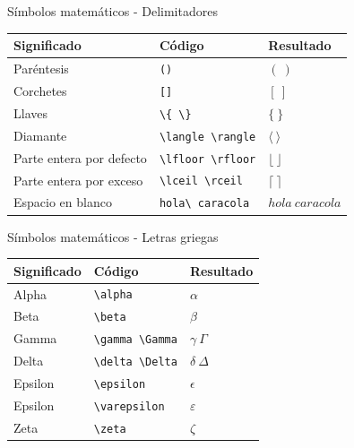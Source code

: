 \documentclass[
  ignorenonframetext,
  aspectratio=169]{beamer}
\begin{document}
\begin{frame}[fragile]{Símbolos matemáticos - Delimitadores}
\protect\hypertarget{suxedmbolos-matemuxe1ticos---delimitadores}{}
\begin{longtable}[]{@{}lll@{}}
\toprule()
Significado & Código & Resultado \\
\midrule()
\endhead
Paréntesis & \texttt{()} & \((\ )\) \\
Corchetes & \texttt{{[}{]}} & \([\ ]\) \\
Llaves & \texttt{\textbackslash{}\{\ \textbackslash{}\}} & \(\{\ \}\) \\
Diamante & \texttt{\textbackslash{}langle\ \textbackslash{}rangle} &
\(\langle\ \rangle\) \\
Parte entera por defecto &
\texttt{\textbackslash{}lfloor\ \textbackslash{}rfloor} &
\(\lfloor\  \rfloor\) \\
Parte entera por exceso &
\texttt{\textbackslash{}lceil\ \textbackslash{}rceil} &
\(\lceil\ \rceil\) \\
Espacio en blanco & \texttt{hola\textbackslash{}\ caracola} &
\(hola\ caracola\) \\
\bottomrule()
\end{longtable}
\end{frame}

\begin{frame}[fragile]{Símbolos matemáticos - Letras griegas}
\protect\hypertarget{suxedmbolos-matemuxe1ticos---letras-griegas}{}
\begin{longtable}[]{@{}lll@{}}
\toprule()
Significado & Código & Resultado \\
\midrule()
\endhead
Alpha & \texttt{\textbackslash{}alpha} & \(\alpha\) \\
Beta & \texttt{\textbackslash{}beta} & \(\beta\) \\
Gamma & \texttt{\textbackslash{}gamma\ \textbackslash{}Gamma} &
\(\gamma\  \Gamma\) \\
Delta & \texttt{\textbackslash{}delta\ \textbackslash{}Delta} &
\(\delta\  \Delta\) \\
Epsilon & \texttt{\textbackslash{}epsilon} & \(\epsilon\) \\
Epsilon & \texttt{\textbackslash{}varepsilon} & \(\varepsilon\) \\
Zeta & \texttt{\textbackslash{}zeta} & \(\zeta\) \\
\bottomrule()
\end{longtable}
\end{frame}
\end{document}
